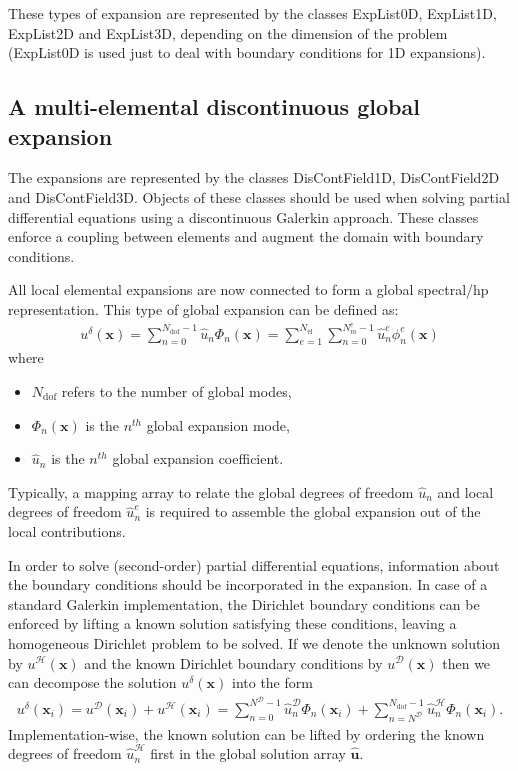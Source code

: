 These types of expansion are represented by the classes ExpList0D, ExpList1D,
ExpList2D and ExpList3D, depending on the dimension of the problem (ExpList0D is
used just to deal with boundary conditions for 1D expansions).

\subsection{A multi-elemental discontinuous global expansion}
The expansions are represented by the classes DisContField1D, DisContField2D and
DisContField3D. Objects of these classes should be used when solving partial
differential equations using a discontinuous Galerkin approach. These classes
enforce a coupling between elements and augment the domain with boundary
conditions.

All local elemental expansions are now connected to form a global spectral/hp
representation. This type of global expansion can be defined as:
\begin{align*}
u^{\delta}(\boldsymbol{x})=\sum_{n=0}^{N_{\mathrm{dof}}-1}\hat{u}_n
  \Phi_n(\boldsymbol{x})=\sum_{e=1}^{{N_{\mathrm{el}}}}
  \sum_{n=0}^{N^{e}_m-1}\hat{u}_n^e\phi_n^e(\boldsymbol{x})
\end{align*}
where
\begin{itemize}
\item $N_{\mathrm{dof}}$ refers to the number of global modes, 
\item $\Phi_n(\boldsymbol{x})$ is the $n^{th}$ global
expansion mode, 
\item $\hat{u}_n$ is the $n^{th}$ global expansion coefficient.
\end{itemize}

Typically, a mapping array to relate the global degrees of freedom
$\hat{u}_n$ and local degrees of freedom $\hat{u}_n^e$ is
required to assemble the global expansion out of the local contributions.

In order to solve (second-order) partial differential equations, information
 about the boundary conditions should be incorporated in the expansion. In case
 of a standard Galerkin implementation, the Dirichlet boundary conditions can be
 enforced by lifting a known solution satisfying these conditions, leaving a
 homogeneous Dirichlet problem to be solved. If we denote the unknown solution
 by $u^{\mathcal{H}}(\boldsymbol{x})$ and the known Dirichlet
 boundary conditions by $u^{\mathcal{D}}(\boldsymbol{x})$ then we can
 decompose the solution $u^{\delta}(\boldsymbol{x})$ into the form
\begin{align*}
  u^{\delta}(\boldsymbol{x}_i)=u^{\mathcal{D}}(\boldsymbol{x}_i)+
  u^{\mathcal{H}}(\boldsymbol{x}_i)=\sum_{n=0}^{N^{\mathcal{D}}-1}
  \hat{u}_n^{\mathcal{D}}\Phi_n(\boldsymbol{x}_i)+
  \sum_{n={N^{\mathcal{D}}}}^{N_{\mathrm{dof}}-1}
  \hat{u}_n^{\mathcal{H}}\Phi_n(\boldsymbol{x}_i).
\end{align*}
Implementation-wise, the known solution can be lifted by ordering the known
degrees of freedom $\hat{u}_n^{\mathcal{H}}$ first in the global
solution array $\boldsymbol{\hat{u}}$.


